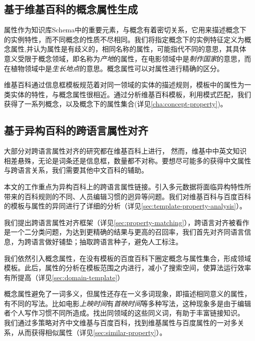 \subsection{基于维基百科的概念属性生成}
属性作为知识库Schema中的重要元素，与概念有着密切关系，它用来描述概念下的实例特性，而不同概念的性质不尽相同。我们将指定概念下的实例特征定义为概念属性,并认为属性是有歧义的，相同名称的属性，可能指代不同的意思，其具体意义受限于概念领域，即名称为\textit{产地}的属性，在电影领域中是\textit{制作国家}的意思，而在植物领域中是\textit{生长地点}的意思。概念属性可以对属性进行精确的区分。

维基百科通过{\heiti 信息框模板}规范着对同一领域的实体的描述规则，模板中的属性为一类实体的特性，与概念属性很相近。通过分析维基百科模板，利用模式匹配，我们获得了一系列概念，以及概念下的属性集合(详见\ref{cha:concept-property})。


\subsection{基于异构百科的跨语言属性对齐}
大部分对跨语言属性对齐的研究都在维基百科上进行，
然而，维基中中英文知识相差悬殊，无论是词条还是信息框，数量都不对称。要想尽可能多的获得中文属性与跨语言关系，我们需要其他中文百科的辅助。

本文的工作重点为异构百科上的跨语言属性链接。引入多元数据将面临异构特性所带来的百科规则的不同、人员编辑习惯的迥异等问题。我们对维基百科与百度百科的模板与属性的异同进行了详细的分析（详见\ref{sec:template-property-analysis}）。

我们提出跨语言属性对齐框架（详见\ref{sec:property-matching}），跨语言对齐被看作是一个二分类问题，为达到更精确的结果与更高的召回率，我们首先对齐同语言信息，为跨语言做好铺垫；抽取跨语言种子，避免人工标注。

我们依然引入概念属性，在没有模板的百度百科下圈定概念与属性集合，形成领域模板。此后，属性的分析在模板范围之内进行，减小了搜索空间，使算法运行效率有所提高（详见\ref{sec:domain-template}）

概念属性避免了一词多义，但属性还存在一义多词现象，即描述相同意义的属性，有不同的写法。比如电影\textit{上映时间}有\textit{首映时间}等多种写法，这种现象多是由于编辑者个人写作习惯不同所造成。找出同领域的这些同义词，有助于丰富链接知识。
我们通过多策略对齐中文维基与百度百科，找到维基属性与百度属性的一对多关系，从而获得相似属性（详见\ref{sec:similar-property}）。

